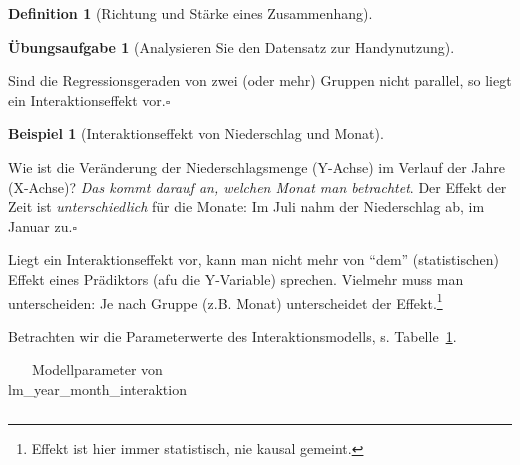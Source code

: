 \documentclass[
  a4paper,
  DIV=11]{scrreprt}
\theoremstyle{definition}
\newtheorem{exercise}{Übungsaufgabe}[chapter]
\theoremstyle{definition}
\newtheorem{example}{Beispiel}[chapter]
\theoremstyle{definition}
\newtheorem{definition}{Definition}[chapter]
\theoremstyle{remark}
\begin{document}
\begin{definition}[Richtung und Stärke eines
Zusammenhang]
\begin{exercise}[Analysieren Sie den Datensatz zur
Handynutzung]
\begin{tcolorbox}
Sind die Regressionsgeraden von zwei (oder mehr) Gruppen nicht parallel,
so liegt ein Interaktionseffekt vor.\(\square\)

\end{tcolorbox}

\begin{example}[Interaktionseffekt von Niederschlag und
Monat]\protect\hypertarget{exm-interakt-precip}{}\label{exm-interakt-precip}

Wie ist die Veränderung der Niederschlagsmenge (Y-Achse) im Verlauf der
Jahre (X-Achse)? \emph{Das kommt darauf an, welchen Monat man
betrachtet}. Der Effekt der Zeit ist \emph{unterschiedlich} für die
Monate: Im Juli nahm der Niederschlag ab, im Januar zu.\(\square\)

\end{example}

Liegt ein Interaktionseffekt vor, kann man nicht mehr von ``dem''
(statistischen) Effekt eines Prädiktors (afu die Y-Variable) sprechen.
Vielmehr muss man unterscheiden: Je nach Gruppe (z.B. Monat)
unterscheidet der Effekt.\footnote{Effekt ist hier immer statistisch,
  nie kausal gemeint.}

Betrachten wir die Parameterwerte des Interaktionsmodells, s.
Tabelle~\ref{tbl-lm_year_month_interaktion}.

\begin{longtable}[]{@{}
  >{\raggedright\arraybackslash}p{}
  >{\centering\arraybackslash}p{}
  >{\centering\arraybackslash}p{}
  >{\centering\arraybackslash}p{}
  >{\centering\arraybackslash}p{}
  >{\centering\arraybackslash}p{}@{}}

\caption{\label{tbl-lm_year_month_interaktion}Modellparameter von
lm\_year\_month\_interaktion}

\tabularnewline


\end{longtable}
\end{exercise}
\end{definition}
\end{document}
